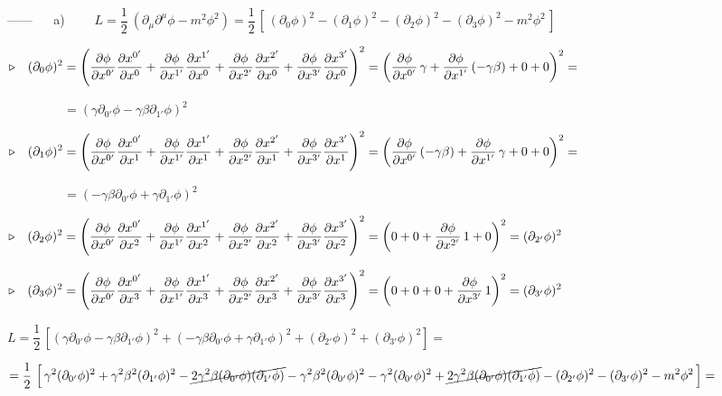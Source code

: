 \vspace{5mm}

\color{NavyBlue}

------ $\quad$ a)
$ \qquad L=\dfrac 1 2 \ (\partial_\mu \partial^\mu \phi - m^2 \phi^2)=\dfrac 1 2 \, \left[\, (\partial_0 \phi)^2-(\partial_1 \phi)^2-(\partial_2 \phi)^2-(\partial_3 \phi)^2 - m^2\phi^2 \, \right] $

$\triangleright \quad \displaystyle (\partial_0 \phi)^2=
\left( \pdv{\phi}{x^{0'}} \pdv{x^{0'}}{x^0}+ \pdv{\phi}{x^{1'}} \pdv{x^{1'}}{x^0}+ \pdv{\phi}{x^{2'}} \pdv{x^{2'}}{x^0}+ \pdv{\phi}{x^{3'}} \pdv{x^{3'}}{x^0} \right)^2= 
\left( \pdv{\phi}{x^{0'}} \, \gamma+\pdv{\phi}{x^{1'}} \, (-\gamma \beta) + 0 + 0 \right)^2= $

$\qquad \qquad \ \ =(\gamma \partial_{0'}\phi-\gamma \beta \partial_{1'}\phi)^2 $

$\triangleright \quad \displaystyle (\partial_1 \phi)^2=
\left( \pdv{\phi}{x^{0'}} \pdv{x^{0'}}{x^1}+ \pdv{\phi}{x^{1'}} \pdv{x^{1'}}{x^1}+ \pdv{\phi}{x^{2'}} \pdv{x^{2'}}{x^1}+ \pdv{\phi}{x^{3'}} \pdv{x^{3'}}{x^1} \right)^2=
\left( \pdv{\phi}{x^{0'}} \, (-\gamma \beta) + \pdv{\phi}{x^{1'}} \, \gamma + 0 + 0 \right)^2=$

$\qquad \qquad \ \ =(-\gamma \beta \partial_{0'}\phi+\gamma \partial_{1'}\phi)^2 $

$\triangleright \quad \displaystyle (\partial_2 \phi)^2=
\left( \pdv{\phi}{x^{0'}} \pdv{x^{0'}}{x^2}+ \pdv{\phi}{x^{1'}} \pdv{x^{1'}}{x^2}+ \pdv{\phi}{x^{2'}} \pdv{x^{2'}}{x^2}+ \pdv{\phi}{x^{3'}} \pdv{x^{3'}}{x^2} \right)^2=
\left( 0+0+ \pdv{\phi}{x^{2'}}\, 1 + 0 \right)^2=(\partial_{2'}\phi)^2$

$\triangleright \quad \displaystyle (\partial_3 \phi)^2=
\left( \pdv{\phi}{x^{0'}} \pdv{x^{0'}}{x^3}+ \pdv{\phi}{x^{1'}} \pdv{x^{1'}}{x^3}+ \pdv{\phi}{x^{2'}} \pdv{x^{2'}}{x^3}+ \pdv{\phi}{x^{3'}} \pdv{x^{3'}}{x^3} \right)^2=
\left( 0+0+0+ \pdv{\phi}{x^{3'}}\, 1  \right)^2=(\partial_{3'}\phi)^2$

$\displaystyle L=\dfrac 1 2 \, \left[
(\gamma \partial_{0'}\phi-\gamma \beta \partial_{1'}\phi)^2 + (-\gamma \beta \partial_{0'}\phi+\gamma \partial_{1'}\phi)^2 + (\partial_{2'}\phi)^2 + (\partial_{3'}\phi)^2
\right]=$

\begin{footnotesize}
$\displaystyle = \dfrac 1 2 \, \left[\, 
\gamma ^2 (\partial_{0'} \phi)^2 + \gamma^2 \beta^2 (\partial_{1'} \phi)^2 -\cancel{2\gamma^2\beta (\partial_{0'}\phi)(\partial_{1'}\phi)}
- \gamma^2 \beta^2 (\partial_{0'}\phi)^2-\gamma^2 (\partial_{0'}\phi)^2 + \cancel{2 \gamma^2\beta (\partial_{0'}\phi)(\partial_{1'}\phi)}-(\partial_{2'}\phi)^2-(\partial_{3'}\phi)^2-m^2\phi^2
\, \right]=$\end{footnotesize}

